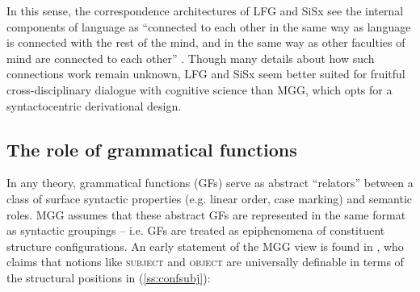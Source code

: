 \documentclass[output=paper,hidelinks]{langscibook}
\begin{document}
In this sense, the correspondence architectures of LFG and SiSx see the internal components of language as ``connected to each other in the same way as language is connected with the rest of the mind, and in the same way as other faculties of mind are connected to each other'' \citep[8]{jackendoff2020texture}. Though many details about how such connections work remain unknown, LFG and SiSx seem better suited for fruitful cross-disciplinary dialogue with cognitive science than MGG, which opts for a syntactocentric derivational design.







\subsection{The role of grammatical functions}\label{ss:sec3}


In any theory, grammatical functions (GFs) serve as abstract ``relators'' between a class of surface syntactic properties (e.g. linear order, case marking) and semantic roles. MGG  assumes that these abstract GFs are represented in the same format as syntactic groupings -- i.e. GFs are treated as epiphenomena of constituent structure configurations. An early statement of the MGG view is found in \citet[68--74]{chomsky1965aspects}, who claims that notions like \textsc{subject} and \textsc{object}  are universally definable in terms of the structural positions in (\ref{ss:confsubj}): %

\begin{exe}
\label{ss:confsubj}
\end{exe}
\end{document}
